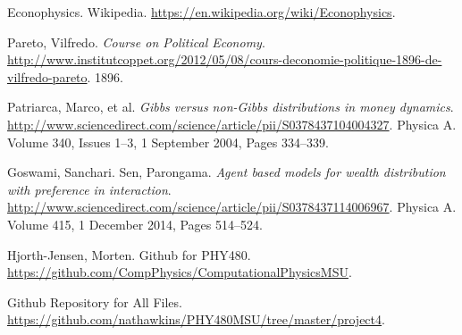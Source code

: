 \documentclass[11pt]{article}
\begin{document}
\begin{thebibliography}{9}
	
	 Econophysics. Wikipedia. \url{https://en.wikipedia.org/wiki/Econophysics}.
	
	 Pareto, Vilfredo. \textit{Course on Political Economy}. \url{http://www.institutcoppet.org/2012/05/08/cours-deconomie-politique-1896-de-vilfredo-pareto}. 1896.
	
	 Patriarca, Marco, et al. \textit{Gibbs versus non-Gibbs distributions in money dynamics}. \url{http://www.sciencedirect.com/science/article/pii/S0378437104004327}. Physica A. Volume 340, Issues 1–3, 1 September 2004, Pages 334–339.
	
	 Goswami, Sanchari. Sen, Parongama. \textit{Agent based models for wealth distribution with preference in interaction}. \url{http://www.sciencedirect.com/science/article/pii/S0378437114006967}. Physica A. Volume 415, 1 December 2014, Pages 514–524.
	
	 Hjorth-Jensen, Morten. Github for PHY480. \url{https://github.com/CompPhysics/ComputationalPhysicsMSU}.
	
	 Github Repository for All Files. \url{https://github.com/nathawkins/PHY480MSU/tree/master/project4}.
	
\end{thebibliography}
\end{document}

